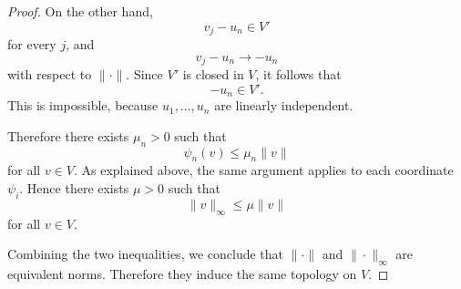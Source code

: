 \begin{proof}
    On the other hand,
    \[
        v_j-u_n\in V'
    \]
    for every \(j\), and
    \[
        v_j-u_n\longrightarrow -u_n
    \]
    with respect to \(\|\cdot\|\). Since \(V'\) is closed in \(V\), it follows that
    \[
        -u_n\in V'.
    \]
    This is impossible, because \(u_1,\dots,u_n\) are linearly independent.

    Therefore there exists \(\mu_n>0\) such that
    \[
        \psi_n(v)\leq \mu_n\|v\|
    \]
    for all \(v\in V\). As explained above, the same argument applies to each
    coordinate \(\psi_i\). Hence there exists \(\mu>0\) such that
    \[
        \|v\|_{\infty}\leq \mu\|v\|
    \]
    for all \(v\in V\).

    Combining the two inequalities, we conclude that \(\|\cdot\|\) and
    \(\|\cdot\|_{\infty}\) are equivalent norms. Therefore they induce the same
    topology on \(V\).
\end{proof}
